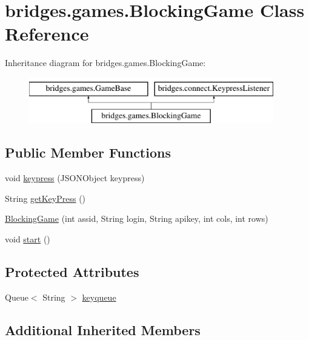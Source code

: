 \hypertarget{classbridges_1_1games_1_1_blocking_game}{}\section{bridges.\+games.\+Blocking\+Game Class Reference}
\label{classbridges_1_1games_1_1_blocking_game}
Inheritance diagram for bridges.\+games.\+Blocking\+Game\+:\begin{figure}[H]
\begin{center}
\leavevmode
\includegraphics[height=2.000000cm]{classbridges_1_1games_1_1_blocking_game}
\end{center}
\end{figure}
\subsection*{Public Member Functions}
\begin{DoxyCompactItemize}
\item 
void \hyperlink{classbridges_1_1games_1_1_blocking_game_a53b1b38826785ee7c7a13f486b7b72ba}{keypress} (J\+S\+O\+N\+Object keypress)
\item 
String \hyperlink{classbridges_1_1games_1_1_blocking_game_ac96929a7b516825835d9c9314ed0fdc1}{get\+Key\+Press} ()
\item 
\hyperlink{classbridges_1_1games_1_1_blocking_game_a0ebcf0a4ae8d81173a58d4458a9538cc}{Blocking\+Game} (int assid, String login, String apikey, int cols, int rows)
\item 
void \hyperlink{classbridges_1_1games_1_1_blocking_game_a00f9ad93393ba18407940f24aaddfa21}{start} ()
\end{DoxyCompactItemize}
\subsection*{Protected Attributes}
\begin{DoxyCompactItemize}
\item 
Queue$<$ String $>$ \hyperlink{classbridges_1_1games_1_1_blocking_game_a7a8057fd0e008879f89c86d929cc92e6}{keyqueue}
\end{DoxyCompactItemize}
\subsection*{Additional Inherited Members}


